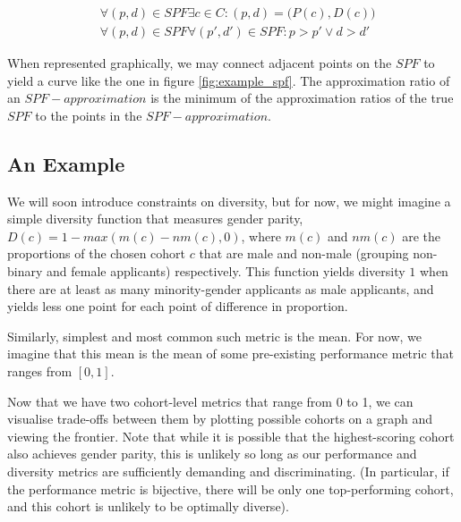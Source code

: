 \begin{equation}
    \label{eq:spf_approx_defn}
    \begin{split}
        &\forall (p, d) \in SPF \exists c \in C :(p, d) = \bigl( P(c), D(c) \bigr)  \\
        &\forall (p, d) \in SPF \forall (p', d') \in SPF :p > p' \lor d > d'
    \end{split}
\end{equation}

When represented graphically, we may connect adjacent points on the $SPF$ to yield a curve like the one in figure \ref{fig:example_spf}. The approximation ratio of an $SPF-approximation$ is the minimum of the approximation ratios of the true $SPF$ to the points in the $SPF-approximation$.

\subsection{An Example}
We will soon introduce constraints on diversity, but for now, we might imagine a simple diversity function that measures gender parity, $D(c) = 1 - max(m(c) - nm(c), 0)$, where $m(c)$ and $nm(c)$ are the proportions of the chosen cohort $c$ that are male and non-male (grouping non-binary and female applicants) respectively. This function yields diversity $1$ when there are at least as many minority-gender applicants as male applicants, and yields less one point for each point of difference in proportion.

Similarly, simplest and most common such metric is the mean. For now, we imagine that this mean is the mean of some pre-existing performance metric that ranges from $[0,1]$.

Now that we have two cohort-level metrics that range from 0 to 1, we can visualise trade-offs between them by plotting possible cohorts on a graph and viewing the frontier. Note that while it is possible that the highest-scoring cohort also achieves gender parity, this is unlikely so long as our performance and diversity metrics are sufficiently demanding and discriminating. (In particular, if the performance metric is bijective, there will be only one top-performing cohort, and this cohort is unlikely to be optimally diverse).

